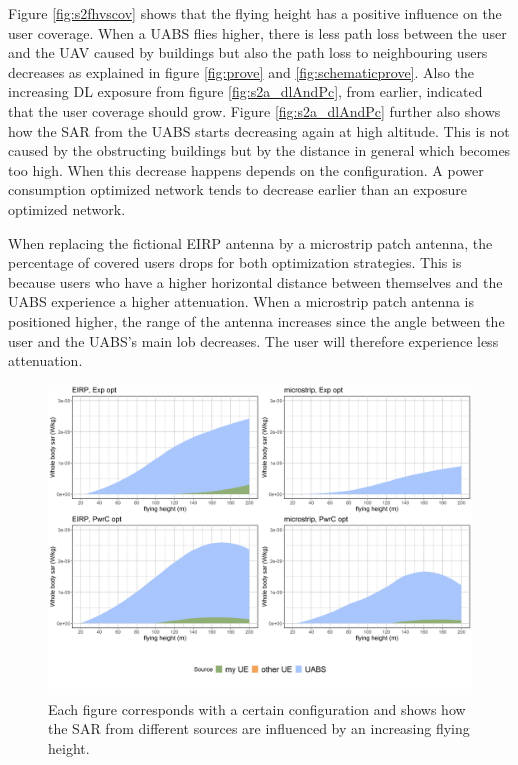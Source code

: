 Figure  \ref{fig:s2fhvscov} shows that the flying height has a positive influence on the user coverage. 
When a \gls{UABS} flies higher, there is less path loss between the user and the \gls{UAV} caused by buildings but also the path loss to neighbouring 
users decreases as explained 
in figure \ref{fig:prove} and \ref{fig:schematicprove}. 
Also the increasing \gls{DL} exposure  from figure \ref{fig:s2a_dlAndPc}, from earlier, indicated that the
user coverage should grow. 
Figure \ref{fig:s2a_dlAndPc} further also shows how the \gls{SAR} from the \gls{UABS}
starts  decreasing again at high altitude. This is  not caused by the obstructing buildings but by the 
distance in general which becomes too high.  When this decrease happens depends on the configuration.  A power consumption optimized 
network tends to decrease earlier than an exposure optimized network.


When replacing the fictional \gls{EIRP} antenna by a microstrip patch antenna, the percentage of covered users drops for both 
optimization strategies. This is because users who have a higher horizontal distance between themselves and the \gls{UABS} 
experience a higher attenuation. When a microstrip patch antenna is positioned higher, the range of the antenna increases 
since the angle between the user and the \gls{UABS}'s main lob decreases. The user will therefore experience less attenuation.

\begin{figure}[h!]
  \includegraphics[width=\textwidth]{../results/s2/fhFourSources.png}
  \caption{Each figure corresponds with a certain configuration and shows how the \gls{SAR} from different sources are influenced by an increasing flying height.}
  \label{fig:s2shfourSourcesMatrix}
\end{figure}


